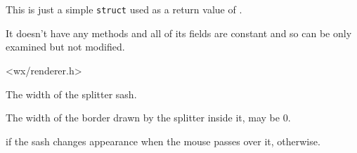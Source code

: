 

\section{}\label{wxsplitterrenderparams}

This is just a simple {\tt struct} used as a return value of 
.

It doesn't have any methods and all of its fields are constant and so can be
only examined but not modified.


<wx/renderer.h>


\label{wxeventwidthsash}


The width of the splitter sash.


\label{wxsplitterrenderparamsborder}


The width of the border drawn by the splitter inside it, may be $0$.


\label{wxsplitterrenderparamsishotsensitive}


\true if the sash changes appearance when the mouse passes over it, \false
otherwise.

